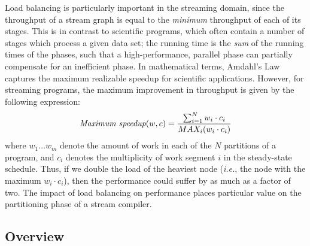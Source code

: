 Load balancing is particularly important in the streaming domain,
since the throughput of a stream graph is equal to the {\it minimum}
throughput of each of its stages.  This is in contrast to scientific
programs, which often contain a number of stages which process a given
data set; the running time is the {\it sum} of the running times of
the phases, such that a high-performance, parallel phase can partially
compensate for an inefficient phase.  In mathematical terms, Amdahl's
Law captures the maximum realizable speedup for scientific
applications.  However, for streaming programs, the maximum
improvement in throughput is given by the following expression:
\begin{align*}
\mbox{\it Maximum speedup}(w, c) = \frac{\sum_{i=1}^N{w_i \cdot c_i}}{MAX_i(w_i \cdot c_i)}
\end{align*}
where $w_1 \dots w_m$ denote the amount of work in each of the $N$
partitions of a program, and $c_i$ denotes the multiplicity of work
segment $i$ in the steady-state schedule.  Thus, if we double the load
of the heaviest node ({\it i.e.}, the node with the maximum $w_i \cdot
c_i$), then the performance could suffer by as much as a factor of
two.  The impact of load balancing on performance places particular
value on the partitioning phase of a stream compiler.

\subsection{Overview}

